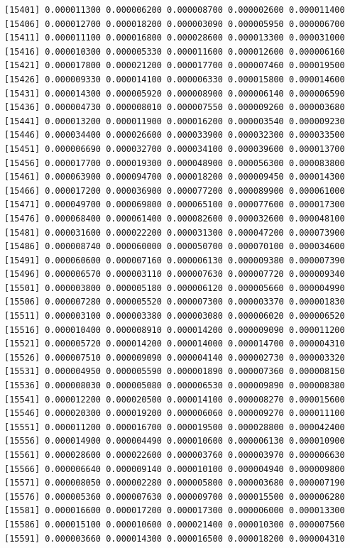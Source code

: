 \documentclass[]{article}
\begin{document}
\begin{verbatim}
[15401] 0.000011300 0.000006200 0.000008700 0.000002600 0.000011400
[15406] 0.000012700 0.000018200 0.000003090 0.000005950 0.000006700
[15411] 0.000011100 0.000016800 0.000028600 0.000013300 0.000031000
[15416] 0.000010300 0.000005330 0.000011600 0.000012600 0.000006160
[15421] 0.000017800 0.000021200 0.000017700 0.000007460 0.000019500
[15426] 0.000009330 0.000014100 0.000006330 0.000015800 0.000014600
[15431] 0.000014300 0.000005920 0.000008900 0.000006140 0.000006590
[15436] 0.000004730 0.000008010 0.000007550 0.000009260 0.000003680
[15441] 0.000013200 0.000011900 0.000016200 0.000003540 0.000009230
[15446] 0.000034400 0.000026600 0.000033900 0.000032300 0.000033500
[15451] 0.000006690 0.000032700 0.000034100 0.000039600 0.000013700
[15456] 0.000017700 0.000019300 0.000048900 0.000056300 0.000083800
[15461] 0.000063900 0.000094700 0.000018200 0.000009450 0.000014300
[15466] 0.000017200 0.000036900 0.000077200 0.000089900 0.000061000
[15471] 0.000049700 0.000069800 0.000065100 0.000077600 0.000017300
[15476] 0.000068400 0.000061400 0.000082600 0.000032600 0.000048100
[15481] 0.000031600 0.000022200 0.000031300 0.000047200 0.000073900
[15486] 0.000008740 0.000060000 0.000050700 0.000070100 0.000034600
[15491] 0.000060600 0.000007160 0.000006130 0.000009380 0.000007390
[15496] 0.000006570 0.000003110 0.000007630 0.000007720 0.000009340
[15501] 0.000003800 0.000005180 0.000006120 0.000005660 0.000004990
[15506] 0.000007280 0.000005520 0.000007300 0.000003370 0.000001830
[15511] 0.000003100 0.000003380 0.000003080 0.000006020 0.000006520
[15516] 0.000010400 0.000008910 0.000014200 0.000009090 0.000011200
[15521] 0.000005720 0.000014200 0.000014000 0.000014700 0.000004310
[15526] 0.000007510 0.000009090 0.000004140 0.000002730 0.000003320
[15531] 0.000004950 0.000005590 0.000001890 0.000007360 0.000008150
[15536] 0.000008030 0.000005080 0.000006530 0.000009890 0.000008380
[15541] 0.000012200 0.000020500 0.000014100 0.000008270 0.000015600
[15546] 0.000020300 0.000019200 0.000006060 0.000009270 0.000011100
[15551] 0.000011200 0.000016700 0.000019500 0.000028800 0.000042400
[15556] 0.000014900 0.000004490 0.000010600 0.000006130 0.000010900
[15561] 0.000028600 0.000022600 0.000003760 0.000003970 0.000006630
[15566] 0.000006640 0.000009140 0.000010100 0.000004940 0.000009800
[15571] 0.000008050 0.000002280 0.000005800 0.000003680 0.000007190
[15576] 0.000005360 0.000007630 0.000009700 0.000015500 0.000006280
[15581] 0.000016600 0.000017200 0.000017300 0.000006000 0.000013300
[15586] 0.000015100 0.000010600 0.000021400 0.000010300 0.000007560
[15591] 0.000003660 0.000014300 0.000016500 0.000018200 0.000004310

\end{verbatim}
\end{document}
